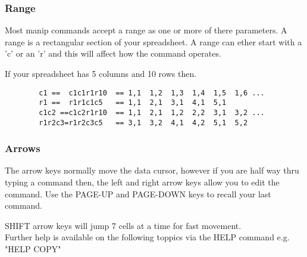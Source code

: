 \subsubsection{Range}
Most manip commands accept a range as one or more of there
parameters.  A range is a rectangular section of your
spreadsheet.  A range can ether start with a 'c' or an
'r' and this will affect how the command operates.

If your spreadsheet has 5 columns and 10 rows then.
\begin{verbatim}
		c1 ==  c1c1r1r10  == 1,1  1,2  1,3  1,4  1,5  1,6 ...
		r1 ==  r1r1c1c5   == 1,1  2,1  3,1  4,1  5,1
		c1c2 ==c1c2r1r10  == 1,1  2,1  1,2  2,2  3,1  3,2 ...
		r1r2c3=r1r2c3c5   == 3,1  3,2  4,1  4,2  5,1  5,2
\end{verbatim}

\subsubsection{Arrows}
The arrow keys normally move the data cursor, however if you are half
way thru typing a command then, the left and right arrow keys allow you
to edit the command.  Use the {\sf PAGE-UP} and {\sf PAGE-DOWN} keys to recall
your last command.

{\sf SHIFT} arrow keys will jump 7 cells at a time for fast movement.\\

Further help is available on the following toppics via
the HELP command e.g. "HELP COPY"

